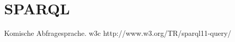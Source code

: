 \chapter{SPARQL}
\label{chap:sparql}

Komische Abfragesprache.
w3c
http://www.w3.org/TR/sparql11-query/

